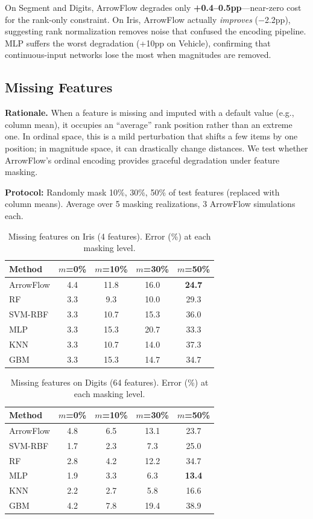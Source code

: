 \documentclass[12pt]{article}
\begin{document}
On Segment and Digits, ArrowFlow degrades only \textbf{+0.4--0.5pp}---near-zero cost for the rank-only constraint. On Iris, ArrowFlow actually \emph{improves} ($-$2.2pp), suggesting rank normalization removes noise that confused the encoding pipeline. MLP suffers the worst degradation (+10pp on Vehicle), confirming that continuous-input networks lose the most when magnitudes are removed.

\subsection{Missing Features}
\label{sec:missing}

\textbf{Rationale.} When a feature is missing and imputed with a default value (e.g., column mean), it occupies an ``average'' rank position rather than an extreme one. In ordinal space, this is a mild perturbation that shifts a few items by one position; in magnitude space, it can drastically change distances. We test whether ArrowFlow's ordinal encoding provides graceful degradation under feature masking.

\textbf{Protocol:} Randomly mask 10\%, 30\%, 50\% of test features (replaced with column means). Average over 5 masking realizations, 3 ArrowFlow simulations each.

\begin{table}[ht]
\centering
\caption{Missing features on Iris (4 features). Error (\%) at each masking level.}
\label{tab:miss-iris}
\begin{tabular}{lcccc}
\toprule
Method & $m$=0\% & $m$=10\% & $m$=30\% & $m$=50\% \\
\midrule
ArrowFlow & 4.4  & 11.8 & 16.0 & \textbf{24.7} \\
RF        & 3.3  & 9.3  & 10.0 & 29.3 \\
SVM-RBF   & 3.3  & 10.7 & 15.3 & 36.0 \\
MLP       & 3.3  & 15.3 & 20.7 & 33.3 \\
KNN       & 3.3  & 10.7 & 14.0 & 37.3 \\
GBM   & 3.3  & 15.3 & 14.7 & 34.7 \\
\bottomrule
\end{tabular}
\end{table}

\begin{table}[ht]
\centering
\caption{Missing features on Digits (64 features). Error (\%) at each masking level.}
\label{tab:miss-digits}
\begin{tabular}{lcccc}
\toprule
Method & $m$=0\% & $m$=10\% & $m$=30\% & $m$=50\% \\
\midrule
ArrowFlow & 4.8  & 6.5  & 13.1 & 23.7 \\
SVM-RBF   & 1.7  & 2.3  & 7.3  & 25.0 \\
RF        & 2.8  & 4.2  & 12.2 & 34.7 \\
MLP       & 1.9  & 3.3  & 6.3  & \textbf{13.4} \\
KNN       & 2.2  & 2.7  & 5.8  & 16.6 \\
GBM   & 4.2  & 7.8  & 19.4 & 38.9 \\
\bottomrule
\end{tabular}
\end{table}
\end{document}
